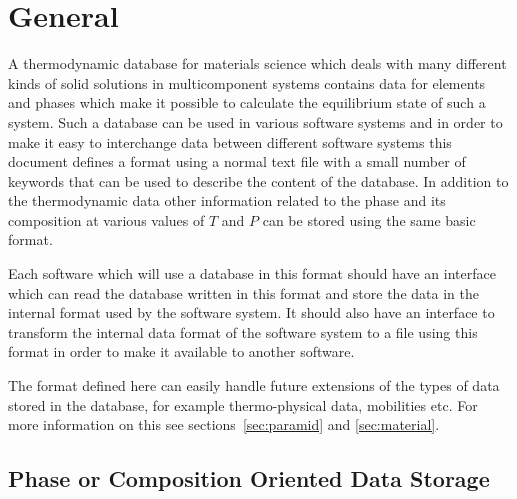 \documentclass[12pt]{article}
\begin{document}
\newpage

\tableofcontents

\newpage

\section{General}

A thermodynamic database for materials science which deals with many
different kinds of solid solutions in multicomponent systems contains
data for elements and phases which make it possible to calculate the
equilibrium state of such a system.  Such a database can be used in
various software systems and in order to make it easy to interchange
data between different software systems this document defines a format
using a normal text file with a small number of keywords that can be
used to describe the content of the database.  In addition to the
thermodynamic data other information related to the phase and its
composition at various values of $T$ and $P$ can be stored using the
same basic format.

Each software which will use a database in this format should have an
interface which can read the database written in this format and store
the data in the internal format used by the software system.  It
should also have an interface to transform the internal data format of
the software system to a file using this format in order to make it
available to another software.

The format defined here can easily handle future extensions of the
types of data stored in the database, for example thermo-physical data,
mobilities etc. For more information on this see
sections~\ref{sec:paramid} and \ref{sec:material}.

\subsection{Phase or Composition Oriented Data Storage}
\end{document}
